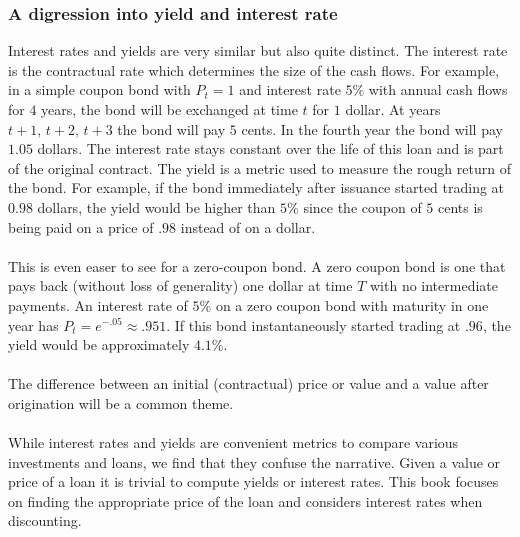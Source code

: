 \documentclass{article}
\theoremstyle{definition}
\begin{document}
\subsubsection{A digression into yield and interest rate}

Interest rates and yields are very similar but also quite distinct.  The interest rate is the contractual rate which determines the size of the cash flows.  For example, in a simple coupon bond with \(P_t=1\) and interest rate \(5\%\) with annual cash flows for \(4\) years, the bond will be exchanged at time \(t\) for \(1\) dollar.  At years \(t+1,\,t+2, \,t+3\) the bond will pay \(5\) cents.  In the fourth year the bond will pay \(1.05\) dollars.  The interest rate stays constant over the life of this loan and is part of the original contract.  The yield is a metric used to measure the rough return of the bond.  For example, if the bond immediately after issuance started trading at \(0.98\) dollars, the yield would be higher than \(5\%\) since the coupon of \(5\) cents is being paid on a price of \(.98\) instead of on a dollar.  
\\
\\
This is even easer to see for a zero-coupon bond.  A zero coupon bond is one that pays back (without loss of generality) one dollar at time \(T\) with no intermediate payments.  An interest rate of \(5\%\) on a zero coupon bond with maturity in one year has \(P_t=e^{-.05}\approx .951\).  If this bond instantaneously started trading at \(.96\), the yield would be approximately \(4.1\%\).  
\\
\\
The difference between an initial (contractual) price or value and a value after origination will be a common theme.  
\\
\\
While interest rates and yields are convenient metrics to compare various investments and loans, we find that they confuse the narrative.  Given a value or price of a loan it is trivial to compute yields or interest rates.  This book focuses on finding the appropriate price of the loan and considers interest rates when discounting.
\end{document}
